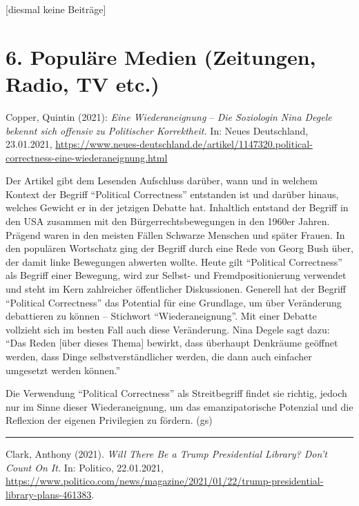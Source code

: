 \documentclass[a4paper,
fontsize=11pt,
oneside,
numbers=noperiodatend,
parskip=half-,
bibliography=totoc,
final
]{scrartcl}
\begin{document}
{[}diesmal keine Beiträge{]}

\hypertarget{populuxe4re-medien-zeitungen-radio-tv-etc.}{%
\section{6. Populäre Medien (Zeitungen, Radio, TV
etc.)}\label{populuxe4re-medien-zeitungen-radio-tv-etc.}}

Copper, Quintin (2021): \emph{Eine Wiederaneignung} -- \emph{Die
Soziologin Nina Degele bekennt sich offensiv zu Politischer
Korrektheit.} In: Neues Deutschland, 23.01.2021,
\url{https://www.neues-deutschland.de/artikel/1147320.political-correctness-eine-wiederaneignung.html}

Der Artikel gibt dem Lesenden Aufschluss darüber, wann und in welchem
Kontext der Begriff \enquote{Political Correctness} entstanden ist und
darüber hinaus, welches Gewicht er in der jetzigen Debatte hat.
Inhaltlich entstand der Begriff in den USA zusammen mit den
Bürgerrechtsbewegungen in den 1960er Jahren. Prägend waren in den
meisten Fällen Schwarze Menschen und später Frauen. In den populären
Wortschatz ging der Begriff durch eine Rede von Georg Bush über, der
damit linke Bewegungen abwerten wollte. Heute gilt \enquote{Political
Correctness} als Begriff einer Bewegung, wird zur Selbst- und
Fremdpositionierung verwendet und steht im Kern zahlreicher öffentlicher
Diskussionen. Generell hat der Begriff \enquote{Political Correctness}
das Potential für eine Grundlage, um über Veränderung debattieren zu
können -- Stichwort \enquote{Wiederaneignung}. Mit einer Debatte
vollzieht sich im besten Fall auch diese Veränderung. Nina Degele sagt
dazu: \enquote{Das Reden {[}über dieses Thema{]} bewirkt, dass überhaupt
Denkräume geöffnet werden, dass Dinge selbstverständlicher werden, die
dann auch einfacher umgesetzt werden können.}

Die Verwendung \enquote{Political Correctness} als Streitbegriff findet
sie richtig, jedoch nur im Sinne dieser Wiederaneignung, um das
emanzipatorische Potenzial und die Reflexion der eigenen Privilegien zu
fördern. (gs)

\begin{center}\rule{0.5\linewidth}{0.5pt}\end{center}

Clark, Anthony (2021). \emph{Will There Be a Trump Presidential Library?
Don't Count On It.} In: Politico, 22.01.2021,
\url{https://www.politico.com/news/magazine/2021/01/22/trump-presidential-library-plans-461383}.
\end{document}
